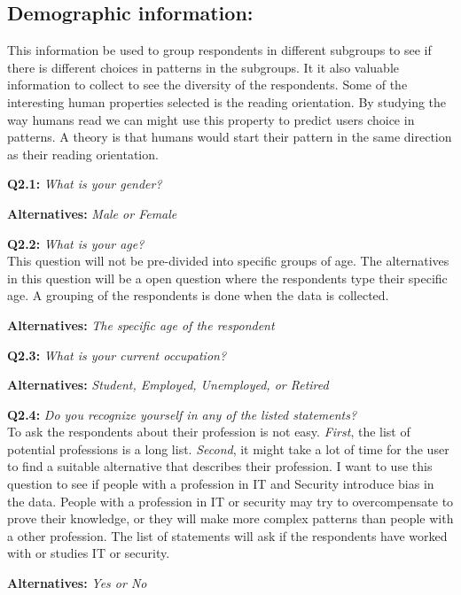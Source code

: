 
    \subsection*{Demographic information:} 
    This information be used to group respondents in different subgroups to see if there is different choices in patterns in the subgroups. It it also valuable information to collect to see the diversity of the respondents. Some of the interesting human properties selected is the reading orientation. By studying the way humans read we can might use this property to predict users choice in patterns. A theory is that humans would start their pattern in the same direction as their reading orientation. 

      {\bf Q2.1:} {\it What is your gender?}
        \begin{enumerate*}
          \item[ ] {\bf Alternatives:} {\it Male or Female}
        \end{enumerate*}
      
      {\bf Q2.2:} {\it What is your age?} \\
      This question will not be pre-divided into specific groups of age. The alternatives in this question will be a open question where the respondents type their specific age. A grouping of the respondents is done when the data is collected.
        \begin{enumerate*}
          \item[ ] {\bf Alternatives:} {\it The specific age of the respondent}
        \end{enumerate*}

      {\bf Q2.3:} {\it What is your current occupation?}
        \begin{enumerate*}
          \item[ ] {\bf Alternatives:} {\it Student, Employed, Unemployed, or Retired}
        \end{enumerate*}

      {\bf Q2.4:} {\it Do you recognize yourself in any of the listed statements?} \\
      To ask the respondents about their profession is not easy. {\it First}, the list of potential professions is a long list. {\it Second}, it might take a lot of time for the user to find a suitable alternative that describes their profession. I want to use this question to see if people with a profession in IT and Security introduce bias in the data. People with a profession in IT or security may try to overcompensate to prove their knowledge, or they will make more complex patterns than people with a other profession. The list of statements will ask if the respondents have worked with or studies IT or security. 
        \begin{enumerate*}
          \item[ ] {\bf Alternatives:} {\it Yes or No}
        \end{enumerate*}

